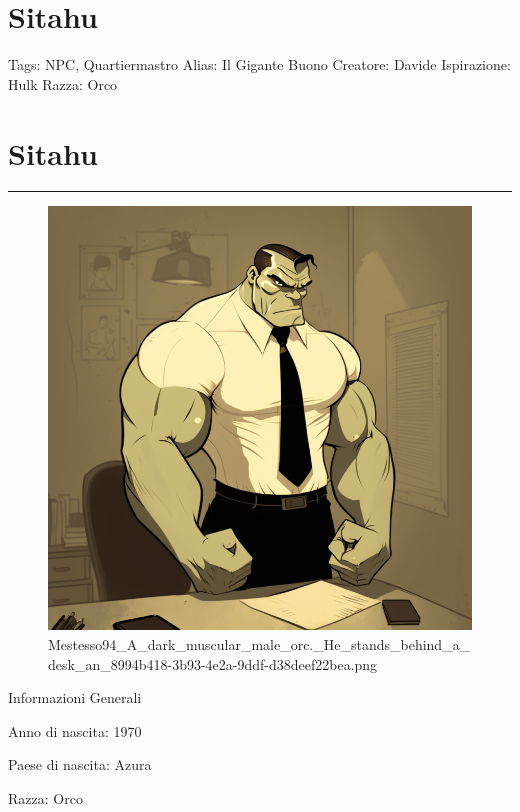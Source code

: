 \section{Sitahu}\label{sitahu}

Tags: NPC, Quartiermastro Alias: Il Gigante Buono Creatore: Davide
Ispirazione: Hulk Razza: Orco

\section{Sitahu}\label{sitahu-1}

\begin{center}\rule{0.5\linewidth}{0.5pt}\end{center}

\begin{figure}
\centering
\includegraphics{Mestesso94_A_dark_muscular_male_orc._He_stands_behind_a_desk_an_8994b418-3b93-4e2a-9ddf-d38deef22bea.png}
\caption{Mestesso94\_A\_dark\_muscular\_male\_orc.\_He\_stands\_behind\_a\_desk\_an\_8994b418-3b93-4e2a-9ddf-d38deef22bea.png}
\end{figure}

Informazioni Generali

Anno di nascita: 1970

Paese di nascita: Azura

Razza: Orco

